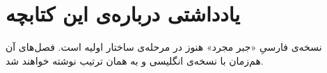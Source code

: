 \chapter*{یادداشتی درباره‌ی این کتابچه}

نسخه‌ی فارسیِ «جبر مجرد» هنوز در مرحله‌ی ساختار اولیه است. فصل‌های آن هم‌زمان با نسخه‌ی انگلیسی و به همان ترتیب نوشته خواهند شد.
